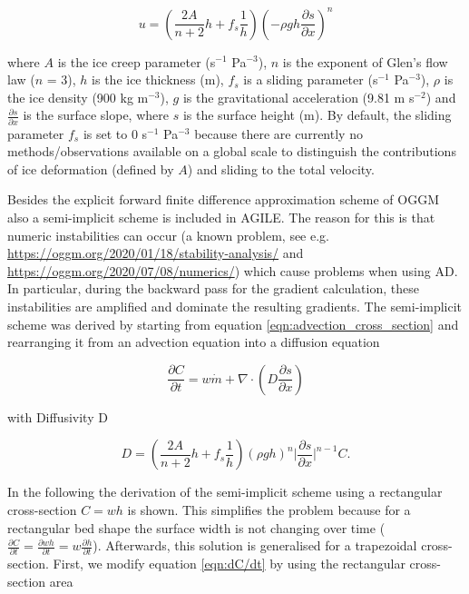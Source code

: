 \documentclass[journal abbreviation, manuscript]{copernicus}
\begin{document}
\begin{equation} \label{eqn:shallow_ice_velocity}
    u = \left( \frac{2A}{n+2} h + f_s \frac{1}{h} \right)\left(- \rho g h \frac{\partial s}{\partial x} \right)^n
\end{equation}

\noindent where $A$ is the ice creep parameter (s$^{-1}$ Pa$^{-3}$), $n$ is the exponent of Glen's flow law ($n$ = 3), $h$ is the ice thickness (m), $f_s$ is a sliding parameter (s$^{-1}$ Pa$^{-3}$), $\rho$ is the ice density (900 kg m$^{-3}$), $g$ is the gravitational acceleration (9.81 m s$^{-2}$) and $\frac{\partial s}{\partial x}$ is the surface slope, where $s$ is the surface height (m). By default, the sliding parameter $f_s$ is set to 0 s$^{-1}$ Pa$^{-3}$ because there are currently no methods/observations available on a global scale to distinguish the contributions of ice deformation (defined by $A$) and sliding to the total velocity.

Besides the explicit forward finite difference approximation scheme of OGGM also a semi-implicit scheme is included in AGILE. The reason for this is that numeric instabilities can occur (a known problem, see e.g. \url{https://oggm.org/2020/01/18/stability-analysis/} and \url{https://oggm.org/2020/07/08/numerics/}) which cause problems when using AD. In particular, during the backward pass for the gradient calculation, these instabilities are amplified and dominate the resulting gradients. The semi-implicit scheme was derived by starting from equation \ref{eqn:advection_cross_section} and rearranging it from an advection equation into a diffusion equation

\begin{equation}\label{eqn:dC/dt}
    \frac{\partial C}{\partial t} = w \Dot{m} + \nabla \cdot (D\frac{\partial s}{\partial x})
\end{equation}

\noindent with Diffusivity D

\begin{equation}\label{eqn:diffusivitiy_with_C}
    D = \left(\frac{2 A}{n + 2} h + f_s \frac{1}{h} \right) (\rho g h)^n \lvert \frac{\partial s}{\partial x} \rvert^{n - 1} C.
\end{equation}

In the following the derivation of the semi-implicit scheme using a rectangular cross-section $C = wh$ is shown. This simplifies the problem because for a rectangular bed shape the surface width is not changing over time ($\frac{\partial C}{\partial t} = \frac{\partial wh}{\partial t} = w\frac{\partial h}{\partial t}$). Afterwards, this solution is generalised for a trapezoidal cross-section. First, we modify equation \ref{eqn:dC/dt} by using the rectangular cross-section area
\end{document}
